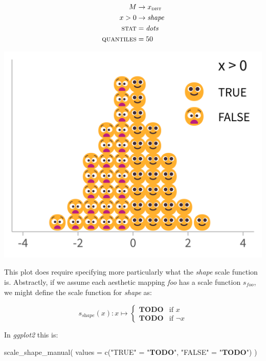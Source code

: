 \documentclass[journal]{vgtc}                     %
\newenvironment{centerverbatim}{%
  \hfill\break
  \small
  \centering
  \varwidth{\linewidth}%
  \verbatim
}{%
  \endverbatim
  \endvarwidth
  \par
  \hfill\break
}
\begin{document}
\noindent
\begin{minipage}{.5\columnwidth}

\begin{align*}
M &\rightarrow x_\textsc{dist}\\
x > 0 &\rightarrow \textit{shape}\\
\textsc{stat} &= \mathit{dots}\\
\textsc{quantiles} &= 50
\end{align*}
\end{minipage}%
  \begin{minipage}{.4\columnwidth}
    \centering
    \includegraphics[width=1.2\columnwidth]{figs/3-dots_emoji.png}
  \end{minipage}
\hfill\break

This plot does require specifying more particularly what the \textit{shape} scale function is. Abstractly, if we assume each aesthetic mapping \textit{foo} has a scale function $s_\textit{foo}$, we might define the scale function for \textit{shape} as:

\[
s_\textit{shape}(x): x \mapsto \left\{ \begin{array}{ll} \textbf{TODO} & \textrm{if } x\\ \textbf{TODO} & \textrm{if }  
 \neg x \end{array} \right.
\]

In \textit{ggplot2} this is:

\begin{centerverbatim}
scale_shape_manual(
  values = c("TRUE" = "\textbf{TODO}", "FALSE" = "\textbf{TODO}")
)  
\end{centerverbatim}
\end{document}
